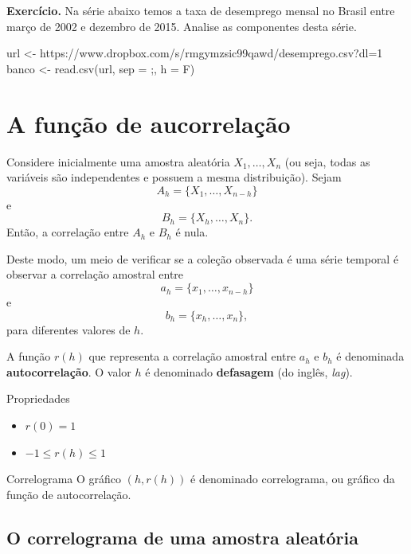 \documentclass[
  letterpaper,
  DIV=11,
  numbers=noendperiod]{scrreprt}
\newenvironment{Shaded}{\begin{snugshade}}{\end{snugshade}}
\newcommand{\AttributeTok}[1]{\textcolor[rgb]{0.40,0.45,0.13}{#1}}
\newcommand{\FunctionTok}[1]{\textcolor[rgb]{0.28,0.35,0.67}{#1}}
\newcommand{\NormalTok}[1]{\textcolor[rgb]{0.00,0.23,0.31}{#1}}
\newcommand{\OtherTok}[1]{\textcolor[rgb]{0.00,0.23,0.31}{#1}}
\newcommand{\StringTok}[1]{\textcolor[rgb]{0.13,0.47,0.30}{#1}}
\begin{document}
\textbf{Exercício.} Na série abaixo temos a taxa de desemprego mensal no
Brasil entre março de 2002 e dezembro de 2015. Analise as componentes
desta série.

\begin{Shaded}
\begin{Highlighting}[]
\NormalTok{url }\OtherTok{\textless{}{-}} \StringTok{\textquotesingle{}https://www.dropbox.com/s/rmgymzsic99qawd/desemprego.csv?dl=1\textquotesingle{}}
\NormalTok{banco }\OtherTok{\textless{}{-}} \FunctionTok{read.csv}\NormalTok{(url, }\AttributeTok{sep =} \StringTok{\textquotesingle{};\textquotesingle{}}\NormalTok{, }\AttributeTok{h =}\NormalTok{ F)}
\end{Highlighting}
\end{Shaded}

\section{A função de
aucorrelação}\label{a-funuxe7uxe3o-de-aucorrelauxe7uxe3o}

Considere inicialmente uma amostra aleatória \(X_1,\ldots,X_n\) (ou
seja, todas as variáveis são independentes e possuem a mesma
distribuição). Sejam \[A_h=\{X_1,\ldots,X_{n-h}\}\] e
\[B_h=\{X_h,\ldots,X_n\}.\] Então, a correlação entre \(A_h\) e \(B_h\)
é nula.

Deste modo, um meio de verificar se a coleção observada é uma série
temporal é observar a correlação amostral entre
\[a_h=\{x_1,\ldots,x_{n-h}\}\] e \[b_h=\{x_h,\ldots,x_n\},\] para
diferentes valores de \(h\).

A função \(r(h)\) que representa a correlação amostral entre \(a_h\) e
\(b_h\) é denominada \textbf{autocorrelação}. O valor \(h\) é denominado
\textbf{defasagem} (do inglês, \emph{lag}).

Propriedades

\begin{itemize}
\item
  \(r(0)=1\)
\item
  \(-1\leq r(h) \leq 1\)
\end{itemize}

Correlograma O gráfico \((h,r(h))\) é denominado correlograma, ou
gráfico da função de autocorrelação.

\subsection{O correlograma de uma amostra
aleatória}\label{o-correlograma-de-uma-amostra-aleatuxf3ria}
\end{document}
